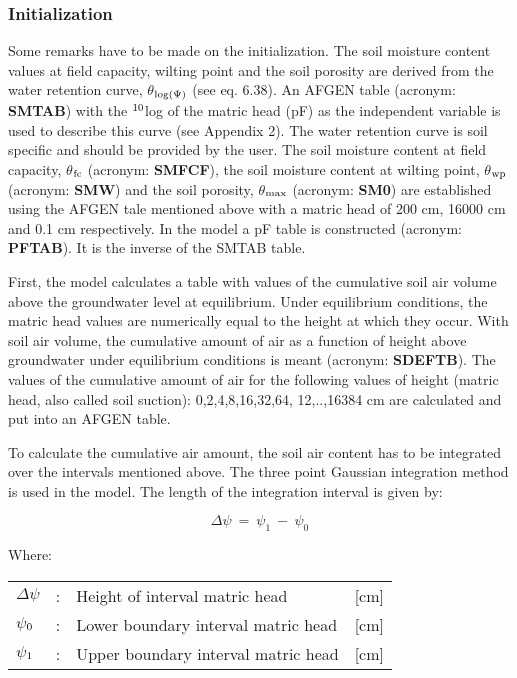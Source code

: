 \subsubsection{Initialization}
Some remarks have to be made on the initialization. The soil moisture content values at
field capacity, wilting point and the soil porosity are derived from the water retention
curve, $\theta$$_{{\rm log(}{\rm \Psi}{)}}$ (see eq. 6.38). An AFGEN table (acronym: 
{\bf SMTAB}) with the $^{{\rm 10}}$log of the
matric head (pF) as the independent variable is used to describe this curve (see Appendix
2). The water retention curve is soil specific and should be provided by the user. The soil
moisture content at field capacity, {\bf $\theta$$_{{\rm fc}}$} (acronym: {\bf SMFCF}), 
the soil moisture content at
wilting point, {\bf $\theta$$_{{\rm wp}}$} (acronym: {\bf SMW}) and the soil porosity, 
{\bf $\theta$$_{{\rm max}}$} (acronym: {\bf SM0}) are
established using the AFGEN tale mentioned above with a matric head of 200 cm, 16000
cm and 0.1 cm respectively. In the model a pF table is constructed (acronym: {\bf PFTAB}).
It is the inverse of the SMTAB table.

First, the model calculates a table with values of the cumulative soil air volume above the
ground\-water level at equilibrium. Under equilibrium conditions, the matric head values
are numerically equal to the height at which they occur. With soil air volume, the
cumulat\-ive amount of air as a function of height above groundwater under equilibrium
conditions is meant (acronym: {\bf SDEFTB}). The values of the cumulative amount of air for
the following values of height (matric head, also called soil suction): 0,2,4,8,16,32,64,
12,..,16384 cm are calculated and put into an AFGEN table. 

To calculate the cumulative air amount, the soil air content has to be integrated over the
intervals mentioned above. The three point Gaussian integration method is used in the
model. The length of the integration interval is given by:

\begin{equation}
\Delta  \psi ~=~ \psi _{1} ~-~ \psi _{0} 
\end{equation}

Where:\\
\begin{tabularx}{\textwidth}{llXr}
$\Delta$$\psi$ &:& Height of interval matric head  & [cm]\\
$\psi$$_{{\rm 0}}$ &:& Lower boundary interval matric head  & [cm]\\
$\psi$$_{{\rm 1}}$ &:& Upper boundary interval matric head  & [cm]\\
\end{tabularx}


